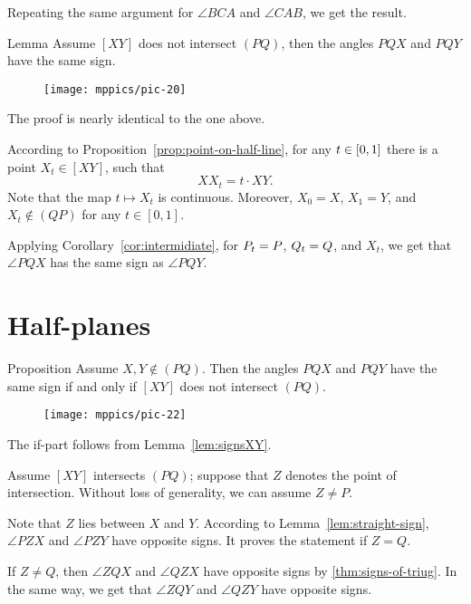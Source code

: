 Repeating the same argument for $\angle BCA$ and $\angle CAB$,
we get the result.
\qeds

\begin{thm}[\abs]{Lemma}\label{lem:signsXY}
Assume $[XY]$ does not intersect $(PQ)$,
then the angles $PQX$ and $PQY$ 
have the same sign.
\end{thm}

\begin{wrapfigure}{o}{26mm}
\vskip-4mm
\centering
\texttt{[image: mppics/pic-20]}
\end{wrapfigure}

The proof is nearly identical to the one above.

According to Proposition~\ref{prop:point-on-half-line},
for any $t\z\in [0,1]$ there is a point  $X_t\in[XY]$, 
such that 
\[XX_t= t\cdot XY.\]
Note that the map $t\mapsto X_t$ is continuous.
Moreover, $X_0=X$, $X_1=Y$, and $X_t\notin(QP)$ for any $t\in [0,1]$.

Applying Corollary~\ref{cor:intermidiate},
for $P_t\z=P$, $Q_t\z=Q$, and $X_t$, we get that
$\angle PQX$ has the same sign as $\angle PQY$.
\qeds

\section{Half-planes}

\begin{thm}{Proposition}\label{prop:half-plane}
Assume $X,Y\notin(PQ)$.
Then the angles $PQX$ and $PQY$ have the same sign if and only if $[XY]$ does not intersect $(PQ)$.
\end{thm}

\begin{wrapfigure}{o}{30mm}
\texttt{[image: mppics/pic-22]}
\centering
\end{wrapfigure}

 The if-part follows from Lemma~\ref{lem:signsXY}. 

Assume $[XY]$ intersects $(PQ)$;
suppose that $Z$ denotes the point of intersection.
Without loss of generality, we can assume $Z\ne P$.

Note that $Z$ lies between $X$ and $Y$.
According to Lemma~\ref{lem:straight-sign}, $\angle PZX$ and $\angle PZY$ have opposite signs.
It proves the statement if $Z=Q$.

If $Z\ne Q$, then $\angle ZQX$ and $\angle QZX$ have opposite signs by \ref{thm:signs-of-triug}.
In the same way, we get that $\angle ZQY$ and $\angle QZY$ have opposite signs.

